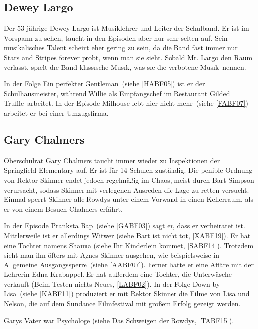 \subsection{Dewey Largo}\label{DeweyLargo}
Der 53-jährige Dewey Largo ist Musiklehrer und Leiter der Schulband. Er ist im Vorspann zu sehen, taucht in den Episoden aber nur sehr selten auf. Sein musikalisches Talent scheint eher gering zu sein, da die Band fast immer nur Stars and Stripes forever probt, wenn man sie sieht. Sobald Mr. Largo den Raum verlässt, spielt die Band klassische Musik, was sie die \glqq verbotene Musik\grqq\ nennen.

In der Folge \glqq Ein perfekter Gentleman\grqq\ (siehe \ref{HABF05}) ist er der Schulhausmeister, während Willie als Empfangschef im Restaurant \glqq Gilded Truffle\grqq\ arbeitet. In der Episode \glqq Milhouse lebt hier nicht mehr\grqq\ (siehe \ref{FABF07}) arbeitet er bei einer Umzugsfirma.

\subsection{Gary Chalmers}\label{GaryChalmers}
Oberschulrat Gary Chalmers taucht immer wieder zu Inspektionen der Springfield Elementary auf. Er ist für 14 Schulen zuständig. Die penible Ordnung von Rektor Skinner endet jedoch regelmäßig im Chaos, meist durch Bart Simpson verursacht, sodass Skinner mit verlegenen Ausreden die Lage zu retten versucht. Einmal sperrt Skinner alle Rowdys unter einem Vorwand in einen Kellerraum, als er von einem Besuch Chalmers erfährt.

In der Episode \glqq Pranksta Rap\grqq\ (siehe \ref{GABF03}) sagt er, dass er verheiratet ist. Mittlerweile ist er allerdings Witwer (siehe \glqq Bart ist nicht tot\grqq, \ref{XABF19}). Er hat eine Tochter namens Shauna (siehe \glqq Ihr Kinderlein kommet\grqq , \ref{SABF14}). Trotzdem sieht man ihn öfters mit Agnes Skinner ausgehen, wie beispielsweise in \glqq Allgemeine Ausgangssperre\grqq\ (siehe \ref{AABF07}). Ferner hatte er eine Affäre mit der Lehrerin Edna Krabappel. Er hat außerdem eine Tochter, die Unterwäsche verkauft (\glqq Beim Testen nichts Neues\grqq , \ref{LABF02}).
In der Folge \glqq Down by Lisa\grqq\ (siehe \ref{KABF11}) produziert er mit Rektor Skinner die Filme von Lisa und Nelson, die auf dem Sundance Filmfestival mit großem Erfolg gezeigt werden.

Garys Vater war Psychologe (siehe \glqq Das Schweigen der Rowdys\grqq , \ref{TABF15}).

